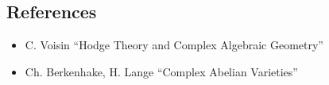 \documentclass{article}
\theoremstyle{definition}
\begin{document}
\subsection*{References}

\begin{itemize}
    \item C. Voisin ``Hodge Theory and Complex Algebraic Geometry''
    \item Ch. Berkenhake, H. Lange ``Complex Abelian Varieties''
\end{itemize}
\end{document}
